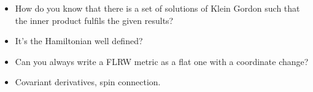 \begin{itemize}
	\item How do you know that there is a set of solutions of Klein Gordon such that the inner product fulfils the given results?
	\item It's the Hamiltonian well defined?
	\item Can you always write a FLRW metric as a flat one with a coordinate change?
	\item Covariant derivatives, spin connection.
\end{itemize}